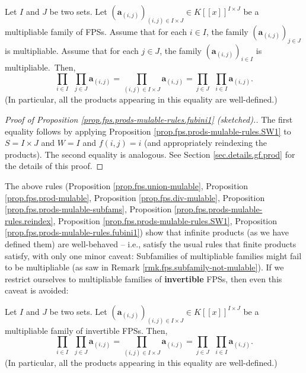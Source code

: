 \begin{proposition}
%
\label{prop.fps.prods-mulable-rules.fubini1}Let $I$ and $J$ be two sets. Let
$\left(  \mathbf{a}_{\left(  i,j\right)  }\right)  _{\left(  i,j\right)  \in
I\times J}\in K\left[  \left[  x\right]  \right]  ^{I\times J}$ be a
multipliable family of FPSs. Assume that for each $i\in I$, the family
$\left(  \mathbf{a}_{\left(  i,j\right)  }\right)  _{j\in J}$ is multipliable.
Assume that for each $j\in J$, the family $\left(  \mathbf{a}_{\left(
i,j\right)  }\right)  _{i\in I}$ is multipliable.\ Then,%
\[
\prod_{i\in I}\ \ \prod_{j\in J}\mathbf{a}_{\left(  i,j\right)  }%
=\prod_{\left(  i,j\right)  \in I\times J}\mathbf{a}_{\left(  i,j\right)
}=\prod_{j\in J}\mathbf{\ \ }\prod_{i\in I}\mathbf{a}_{\left(  i,j\right)  }.
\]
(In particular, all the products appearing in this equality are well-defined.)
\end{proposition}

\begin{proof}
[Proof of Proposition \ref{prop.fps.prods-mulable-rules.fubini1}
(sketched).]The first equality follows by applying Proposition
\ref{prop.fps.prods-mulable-rules.SW1} to $S=I\times J$ and $W=I$ and
$f\left(  i,j\right)  =i$ (and appropriately reindexing the products). The
second equality is analogous. See Section \ref{sec.details.gf.prod} for the
details of this proof.
\end{proof}

The above rules (Proposition \ref{prop.fps.union-mulable}, Proposition
\ref{prop.fps.prod-mulable}, Proposition \ref{prop.fps.div-mulable},
Proposition \ref{prop.fps.prods-mulable-subfams}, Proposition
\ref{prop.fps.prods-mulable-rules.reindex}, Proposition
\ref{prop.fps.prods-mulable-rules.SW1}, Proposition
\ref{prop.fps.prods-mulable-rules.fubini1}) show that infinite products (as we
have defined them) are well-behaved -- i.e., satisfy the usual rules that
finite products satisfy, with only one minor caveat: Subfamilies of
multipliable families might fail to be multipliable (as saw in Remark
\ref{rmk.fps.subfamily-not-mulable}). If we restrict ourselves to multipliable
families of \textbf{invertible} FPSs, then even this caveat is avoided:

\begin{proposition}
%
\label{prop.fps.prods-mulable-rules.fubini}Let $I$ and $J$ be two sets. Let
$\left(  \mathbf{a}_{\left(  i,j\right)  }\right)  _{\left(  i,j\right)  \in
I\times J}\in K\left[  \left[  x\right]  \right]  ^{I\times J}$ be a
multipliable family of invertible FPSs. Then,%
\[
\prod_{i\in I}\ \ \prod_{j\in J}\mathbf{a}_{\left(  i,j\right)  }%
=\prod_{\left(  i,j\right)  \in I\times J}\mathbf{a}_{\left(  i,j\right)
}=\prod_{j\in J}\mathbf{\ \ }\prod_{i\in I}\mathbf{a}_{\left(  i,j\right)  }.
\]
(In particular, all the products appearing in this equality are well-defined.)
\end{proposition}

